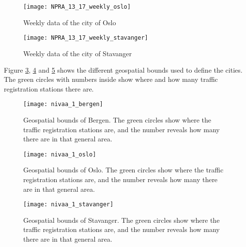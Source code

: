 \begin{figure}[ht]
\texttt{[image: NPRA\_13\_17\_weekly\_oslo]}
\centering
\caption{Weekly data of the city of Oslo}
\label{fig:weeklyoslo}
\end{figure}

\begin{figure}[ht]
\texttt{[image: NPRA\_13\_17\_weekly\_stavanger]}
\centering
\caption{Weekly data of the city of Stavanger}
\label{fig:weeklystavanger}
\end{figure}

Figure \ref{fig:boundsbergen}, \ref{fig:boundsoslo} and \ref{fig:boundsstavanger} shows the different geospatial bounds used to define the cities. The green circles with numbers inside show where and how many traffic registration stations there are.

\begin{figure}[ht]
\texttt{[image: nivaa\_1\_bergen]}
\centering
\caption{Geospatial bounds of Bergen. The green circles show where the traffic registration stations are, and the number reveals how many there are in that general area.}
\label{fig:boundsbergen}
\end{figure}

\begin{figure}[ht]
\texttt{[image: nivaa\_1\_oslo]}
\centering
\caption{Geospatial bounds of Oslo. The green circles show where the traffic registration stations are, and the number reveals how many there are in that general area.}
\label{fig:boundsoslo}
\end{figure}

\begin{figure}[ht]
\texttt{[image: nivaa\_1\_stavanger]}
\centering
\caption{Geospatial bounds of Stavanger. The green circles show where the traffic registration stations are, and the number reveals how many there are in that general area.}
\label{fig:boundsstavanger}
\end{figure}

